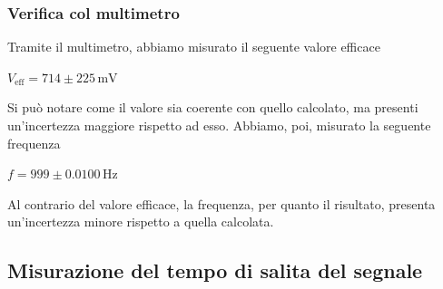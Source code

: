 \documentclass{article}
\begin{document}
			\subsubsection{Verifica col multimetro}
				Tramite il multimetro, abbiamo misurato il seguente valore efficace
				\newline
				\begin{center}
					$ V_{\mathrm{eff}} = 714 \pm 225 \, \mathrm{mV} $
				\end{center}
				Si può notare come il valore sia coerente con quello calcolato, ma presenti un'incertezza maggiore rispetto ad esso.
				\newline
				Abbiamo, poi, misurato la seguente frequenza
				\newline
				\begin{center}
					$ f = 999 \pm 0.0100 \, \mathrm{Hz} $
				\end{center}
				Al contrario del valore efficace, la frequenza, per quanto il risultato, presenta un'incertezza minore rispetto a quella calcolata.
		\subsection{Misurazione del tempo di salita del segnale}
\end{document}
